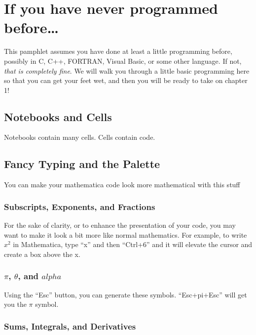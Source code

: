 \chapter*{If you have never programmed before\ldots}
\label{chap:Prelim}

This pamphlet assumes you have done at least a little programming before, possibly in C, C++, FORTRAN, Visual Basic, or some other language. If not, \emph{that is completely fine}. We will walk you through a little basic programming here so that you can get your feet wet, and then you will be ready to take on chapter 1!

\section{Notebooks and Cells}

Notebooks contain many cells. Cells contain code.

\section{Fancy Typing and the Palette}

You can make your mathematica code look more mathematical with this stuff

\subsection{Subscripts, Exponents, and Fractions}

For the sake of clarity, or to enhance the presentation of your code, you may want to make it look a bit more like normal mathematics. For example, to write $x^2$ in Mathematica, type ``x'' and then ``Ctrl+6'' and it will elevate the cursor and create a box above the x.

\subsection{$\pi$, $\theta$, and $alpha$}

Using the ``Esc'' button, you can generate these symbols. ``Esc+pi+Esc'' will get you the $\pi$ symbol.

\subsection{Sums, Integrals, and Derivatives}
